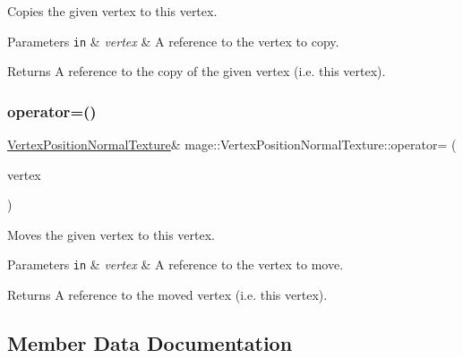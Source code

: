 Copies the given vertex to this vertex.


\begin{DoxyParams}[1]{Parameters}
\mbox{\tt in}  & {\em vertex} & A reference to the vertex to copy. \\
\hline
\end{DoxyParams}
\begin{DoxyReturn}{Returns}
A reference to the copy of the given vertex (i.\+e. this vertex). 
\end{DoxyReturn}
\hypertarget{structmage_1_1_vertex_position_normal_texture_a5a3417f7b3ead1e96147d68e7bb1185f}{}\label{structmage_1_1_vertex_position_normal_texture_a5a3417f7b3ead1e96147d68e7bb1185f} 
\subsubsection{\texorpdfstring{operator=()}{operator=()}\hspace{0.1cm}{\footnotesize\ttfamily [2/2]}}
{\footnotesize\ttfamily \hyperlink{structmage_1_1_vertex_position_normal_texture}{Vertex\+Position\+Normal\+Texture}\& mage\+::\+Vertex\+Position\+Normal\+Texture\+::operator= (\begin{DoxyParamCaption}\item[{\hyperlink{structmage_1_1_vertex_position_normal_texture}{Vertex\+Position\+Normal\+Texture} \&\&}]{vertex }\end{DoxyParamCaption})\hspace{0.3cm}{\ttfamily [default]}}

Moves the given vertex to this vertex.


\begin{DoxyParams}[1]{Parameters}
\mbox{\tt in}  & {\em vertex} & A reference to the vertex to move. \\
\hline
\end{DoxyParams}
\begin{DoxyReturn}{Returns}
A reference to the moved vertex (i.\+e. this vertex). 
\end{DoxyReturn}


\subsection{Member Data Documentation}
\hypertarget{structmage_1_1_vertex_position_normal_texture_a4e6f650ee5968c6dc873e8e41dae5395}{}\label{structmage_1_1_vertex_position_normal_texture_a4e6f650ee5968c6dc873e8e41dae5395} 
